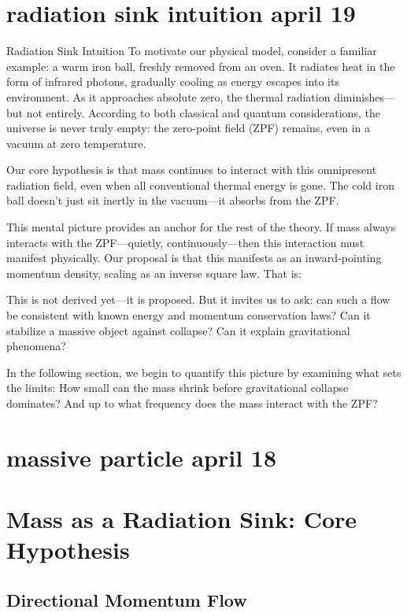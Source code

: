 \documentclass {article}
\begin{document}
\newpage


\section{radiation sink intuition april 19}

Radiation Sink Intuition
To motivate our physical model, consider a familiar example: a warm iron ball, freshly removed from an oven. It radiates heat in the form of infrared photons, gradually cooling as energy escapes into its environment. As it approaches absolute zero, the thermal radiation diminishes—but not entirely. According to both classical and quantum considerations, the universe is never truly empty: the zero-point field (ZPF) remains, even in a vacuum at zero temperature.

Our core hypothesis is that mass continues to interact with this omnipresent radiation field, even when all conventional thermal energy is gone. The cold iron ball doesn't just sit inertly in the vacuum—it absorbs from the ZPF. 

This mental picture provides an anchor for the rest of the theory. If mass always interacts with the ZPF—quietly, continuously—then this interaction must manifest physically. Our proposal is that this manifests as an inward-pointing momentum density, scaling as an inverse square law. That is:


This is not derived yet—it is proposed. But it invites us to ask: can such a flow be consistent with known energy and momentum conservation laws? Can it stabilize a massive object against collapse? Can it explain gravitational phenomena?

In the following section, we begin to quantify this picture by examining what sets the limits: How small can the mass shrink before gravitational collapse dominates? And up to what frequency does the mass interact with the ZPF?



\newpage

\section{massive particle april 18}

\section{Mass as a Radiation Sink: Core Hypothesis}

\subsection{Directional Momentum Flow}
\end{document}
